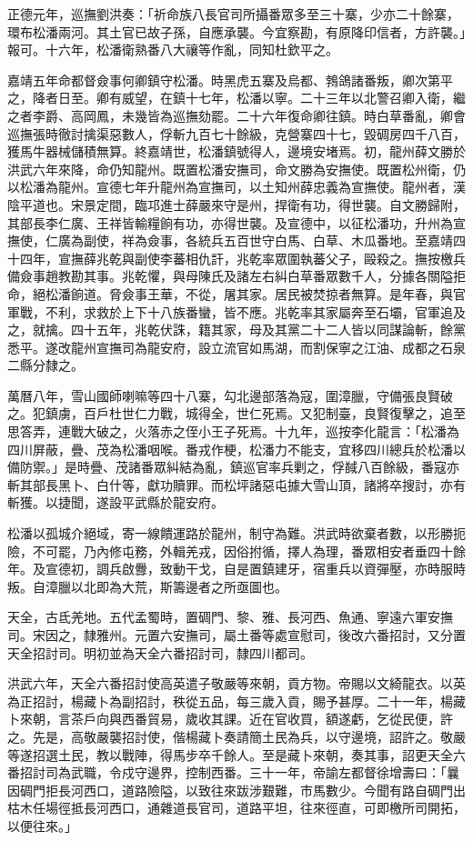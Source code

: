 \begin{pinyinscope}
正德元年，巡撫劉洪奏：「祈命族八長官司所攝番眾多至三十寨，少亦二十餘寨，環布松潘兩河。其土官已故子孫，自應承襲。今宜察勘，有原降印信者，方許襲。」報可。十六年，松潘衛熟番八大禳等作亂，同知杜欽平之。

嘉靖五年命都督僉事何卿鎮守松潘。時黑虎五寨及烏都、鵓鴿諸番叛，卿次第平之，降者日至。卿有威望，在鎮十七年，松潘以寧。二十三年以北警召卿入衛，繼之者李爵、高岡鳳，未幾皆為巡撫劾罷。二十六年復命卿往鎮。時白草番亂，卿會巡撫張時徹討擒渠惡數人，俘斬九百七十餘級，克營寨四十七，毀碉房四千八百，獲馬牛器械儲積無算。終嘉靖世，松潘鎮號得人，邊境安堵焉。初，龍州薛文勝於洪武六年來降，命仍知龍州。既置松潘安撫司，命文勝為安撫使。既置松州衛，仍以松潘為龍州。宣德七年升龍州為宣撫司，以土知州薛忠義為宣撫使。龍州者，漢陰平道也。宋景定間，臨邛進士薛嚴來守是州，捍衛有功，得世襲。自文勝歸附，其部長李仁廣、王祥皆輸糧餉有功，亦得世襲。及宣德中，以征松潘功，升州為宣撫使，仁廣為副使，祥為僉事，各統兵五百世守白馬、白草、木瓜番地。至嘉靖四十四年，宣撫薛兆乾與副使李蕃相仇訐，兆乾率眾圍執蕃父子，毆殺之。撫按檄兵備僉事趙教勘其事。兆乾懼，與母陳氏及諸左右糾白草番眾數千人，分據各關隘拒命，絕松潘餉道。脅僉事王華，不從，屠其家。居民被焚掠者無算。是年春，與官軍戰，不利，求救於上下十八族番蠻，皆不應。兆乾率其家屬奔至石壩，官軍追及之，就擒。四十五年，兆乾伏誅，籍其家，母及其黨二十二人皆以同謀論斬，餘黨悉平。遂改龍州宣撫司為龍安府，設立流官如馬湖，而割保寧之江油、成都之石泉二縣分隸之。

萬曆八年，雪山國師喇嘛等四十八寨，勾北邊部落為寇，圍漳臘，守備張良賢破之。犯鎮虜，百戶杜世仁力戰，城得全，世仁死焉。又犯制臺，良賢復擊之，追至思答弄，連戰大破之，火落赤之侄小王子死焉。十九年，巡按李化龍言：「松潘為四川屏蔽，疊、茂為松潘咽喉。番戎作梗，松潘力不能支，宜移四川總兵於松潘以備防禦。」是時疊、茂諸番眾糾結為亂，鎮巡官率兵剿之，俘馘八百餘級，番寇亦斬其部長黑卜、白什等，獻功贖罪。而松坪諸惡屯據大雪山頂，諸將卒搜討，亦有斬獲。以捷聞，遂設平武縣於龍安府。

松潘以孤城介絕域，寄一線饋運路於龍州，制守為難。洪武時欲棄者數，以形勝扼險，不可罷，乃內修屯務，外輯羌戎，因俗拊循，擇人為理，番眾相安者垂四十餘年。及宣德初，調兵啟釁，致動干戈，自是置鎮建牙，宿重兵以資彈壓，亦時服時叛。自漳臘以北即為大荒，斯籌邊者之所亟圖也。

天全，古氐羌地。五代孟蜀時，置碉門、黎、雅、長河西、魚通、寧遠六軍安撫司。宋因之，隸雅州。元置六安撫司，屬土番等處宣慰司，後改六番招討，又分置天全招討司。明初並為天全六番招討司，隸四川都司。

洪武六年，天全六番招討使高英遣子敬嚴等來朝，貢方物。帝賜以文綺龍衣。以英為正招討，楊藏卜為副招討，秩從五品，每三歲入貢，賜予甚厚。二十一年，楊藏卜來朝，言茶戶向與西番貿易，歲收其課。近在官收買，額遂虧，乞從民便，許之。先是，高敬嚴襲招討使，偕楊藏卜奏請簡土民為兵，以守邊境，詔許之。敬嚴等遂招選土民，教以戰陣，得馬步卒千餘人。至是藏卜來朝，奏其事，詔更天全六番招討司為武職，令戍守邊界，控制西番。三十一年，帝諭左都督徐增壽曰：「曩因碉門拒長河西口，道路險隘，以致往來跋涉艱難，市馬數少。今聞有路自碉門出枯木任場徑抵長河西口，通雜道長官司，道路平坦，往來徑直，可即檄所司開拓，以便往來。」


\end{pinyinscope}

